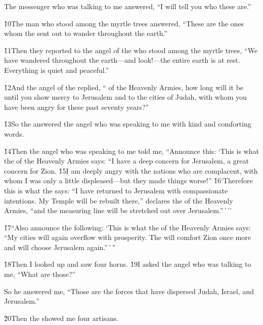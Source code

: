 The messenger who was talking to me answered, ``I will tell you who these are.''

\v{10}The man who stood among the myrtle trees answered, ``These are the ones whom the  sent out to wander throughout the earth.''

\v{11}Then they reported to the angel of the  who stood among the myrtle trees, ``We have wandered throughout the earth---and look!---the entire earth is at rest. Everything is quiet and peaceful.''

\v{12}And the angel of the  replied, `` of the Heavenly Armies, how long will it be until you show mercy to Jerusalem and to the cities of Judah, with whom you have been angry for these past seventy years?''

\v{13}So the  answered the angel who was speaking to me with kind and comforting words.

\v{14}Then the angel who was speaking to me told me, ``Announce this: `This is what the  of the Heavenly Armies says: ``I have a deep concern for Jerusalem, a great concern for Zion. \v{15}I am deeply angry with the nations who are complacent, with whom I was only a little displeased---but they made things worse!'' \v{16}`Therefore this is what the  says: ``I have returned to Jerusalem with compassionate intentions. My Temple will be rebuilt there,'' declares the  of the Heavenly Armies, ``and the measuring line will be stretched out over Jerusalem.''\,'\,''

\v{17}``Also announce the following: `This is what the  of the Heavenly Armies says: ``My cities will again overflow with prosperity. The  will comfort Zion once more and will choose Jerusalem again.''\,'\,''

\v{18}Then I looked up and saw four horns. \v{19}I asked the angel who was talking to me, ``What are those?''

So he answered me, ``Those are the forces that have dispersed Judah, Israel, and Jerusalem.''

\v{20}Then the  showed me four artisans.


